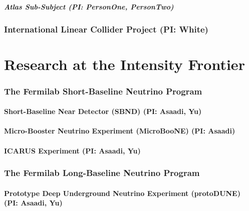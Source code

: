 \documentclass[11pt]{article}
\def\onehead#1{\part{#1}}
\def\twohead#1{\section{#1}}
\def\threehead#1{\subsection{#1}}
\def\fourhead#1{\subsubsection{#1}}
\begin{document}
\fourhead{Atlas Sub-Subject (PI: PersonOne, PersonTwo)}
%


\twohead{International Linear Collider Project (PI: White)}






\onehead{Research at the Intensity Frontier}





\twohead{The Fermilab Short-Baseline Neutrino Program}


\threehead{Short-Baseline Near Detector (SBND) (PI: Asaadi, Yu)}


\threehead{Micro-Booster Neutrino Experiment (MicroBooNE) (PI: Asaadi)}



\threehead{ICARUS Experiment (PI: Asaadi, Yu)}


\twohead{The Fermilab Long-Baseline Neutrino Program}


\threehead{Prototype Deep Underground Neutrino Experiment (protoDUNE) (PI: Asaadi, Yu)}

\end{document}
